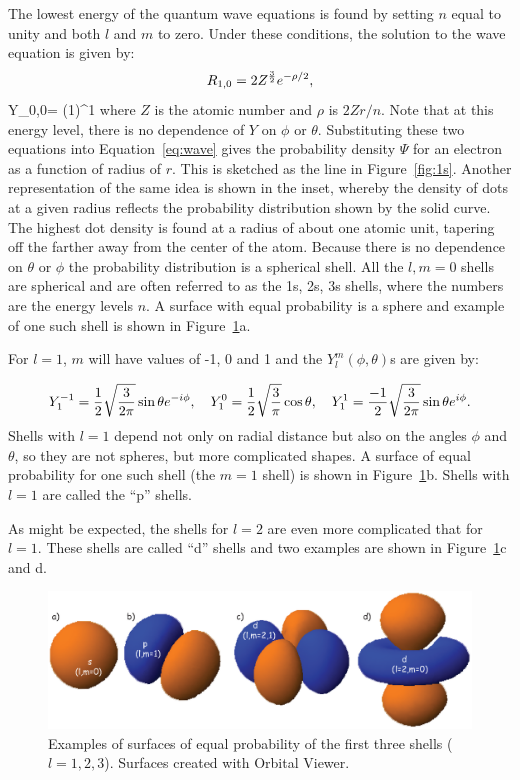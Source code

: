 { The lowest energy of the quantum wave equations is found by setting  $n$ equal to unity and both $l$ and $m$ to zero.   Under these conditions, the solution to the wave equation is given by:
 $$
R_{1,0} = 2  Z^{3\over 2}  e^{-\rho/2},
$$
\beq
Y_{0,0}=  ({1\over {4\pi}})^{1}
\eeq
\noindent where $Z$ is the atomic number and $\rho$ is $2Zr/n$.  Note that at this energy level, there is no dependence of $Y$ on $\phi$ or $\theta$.  Substituting these two equations into Equation~\ref{eq:wave} gives  the probability density  $\Psi$ for  an electron as a function of radius of $r$.  This  is sketched as the line in Figure~\ref{fig:1s}.   Another representation of the same idea is shown in the inset, whereby the density of dots at a given radius reflects the probability distribution shown by the solid curve.  The highest dot density is found at a radius of about one atomic unit, tapering off the farther away from the center of the atom.   Because there is no dependence on $\theta$ or $\phi$ the probability distribution  is a spherical 
shell.    All the $l,m=0$ shells are spherical and are often referred to as the 1s, 2s, 3s shells, where the numbers are the energy levels $n$.   A surface with equal probability is a sphere and example of one such shell is shown in Figure~\ref{fig:shells}a.  

For $l=1$, $m$ will have values of -1, 0 and 1 and the $Y_l^m(\phi,\theta)$s are given by:

$$
Y_1^{-1}= {1\over2} \sqrt{{3\over {2\pi}}}\sin\theta e^{-i\phi}, \hskip 1em Y_1^{0}= {1\over2} \sqrt{{3\over {\pi}}}\cos\theta,  \hskip 1em  Y_1^{1}= {-1\over2} \sqrt{{3\over {2\pi}}}\sin\theta e^{i\phi}.
$$
\noindent Shells with $l=1$ depend not only on radial distance but also on the angles $\phi$ and $\theta$, so they are not spheres, but more complicated shapes.  A surface of equal probability for one such shell (the $m=1$ shell) is shown in Figure~\ref{fig:shells}b.  Shells with $l=1$ are called the  ``p'' shells.  

As might be expected,  the shells for  $l=2$ are even more complicated that for $l=1$.  These shells are called   ``d'' shells and two examples are shown in Figure~\ref{fig:shells}c and d.    




\begin{figure}[h!tb]
\centering  \includegraphics[width=13 cm]{EPSfiles/shells.eps}
\caption{Examples of surfaces of equal probability of the first three shells ($l=1,2,3$).   Surfaces created with Orbital Viewer.    }
\label{fig:shells}
\end{figure}


}
